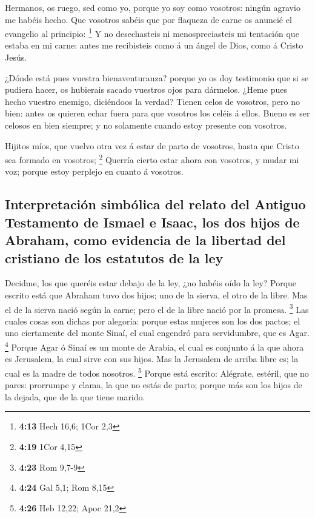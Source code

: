  Hermanos, os ruego, sed como yo, porque yo soy como
vosotros: ningún agravio me habéis hecho.  Que vosotros
sabéis que por flaqueza de carne os anuncié el evangelio al principio:
\footnote{\textbf{4:13} Hech 16,6; 1Cor 2,3}  Y no
desechasteis ni menospreciasteis mi tentación que estaba en mi carne:
antes me recibisteis como á un ángel de Dios, como á Cristo Jesús.

 ¿Dónde está pues vuestra bienaventuranza? porque yo os doy
testimonio que si se pudiera hacer, os hubierais sacado vuestros ojos
para dármelos.  ¿Heme pues hecho vuestro enemigo,
diciéndoos la verdad?  Tienen celos de vosotros, pero no
bien: antes os quieren echar fuera para que vosotros los celéis á ellos.
 Bueno es ser celosos en bien siempre; y no solamente
cuando estoy presente con vosotros.

 Hijitos míos, que vuelvo otra vez á estar de parto de
vosotros, hasta que Cristo sea formado en vosotros; \footnote{\textbf{4:19}
  1Cor 4,15}  Querría cierto estar ahora con vosotros, y
mudar mi voz; porque estoy perplejo en cuanto á vosotros.

\hypertarget{interpretaciuxf3n-simbuxf3lica-del-relato-del-antiguo-testamento-de-ismael-e-isaac-los-dos-hijos-de-abraham-como-evidencia-de-la-libertad-del-cristiano-de-los-estatutos-de-la-ley}{%
\subsection{Interpretación simbólica del relato del Antiguo Testamento
de Ismael e Isaac, los dos hijos de Abraham, como evidencia de la
libertad del cristiano de los estatutos de la
ley}\label{interpretaciuxf3n-simbuxf3lica-del-relato-del-antiguo-testamento-de-ismael-e-isaac-los-dos-hijos-de-abraham-como-evidencia-de-la-libertad-del-cristiano-de-los-estatutos-de-la-ley}}

 Decidme, los que queréis estar debajo de la ley, ¿no
habéis oído la ley?  Porque escrito está que Abraham tuvo
dos hijos; uno de la sierva, el otro de la libre.  Mas el
de la sierva nació según la carne; pero el de la libre nació por la
promesa. \footnote{\textbf{4:23} Rom 9,7-9}  Las cuales
cosas son dichas por alegoría: porque estas mujeres son los dos pactos;
el uno ciertamente del monte Sinaí, el cual engendró para servidumbre,
que es Agar. \footnote{\textbf{4:24} Gal 5,1; Rom 8,15} 
Porque Agar ó Sinaí es un monte de Arabia, el cual es conjunto á la que
ahora es Jerusalem, la cual sirve con sus hijos.  Mas la
Jerusalem de arriba libre es; la cual es la madre de todos nosotros.
\footnote{\textbf{4:26} Heb 12,22; Apoc 21,2}  Porque está
escrito: Alégrate, estéril, que no pares: prorrumpe y clama, la que no
estás de parto; porque más son los hijos de la dejada, que de la que
tiene marido.

